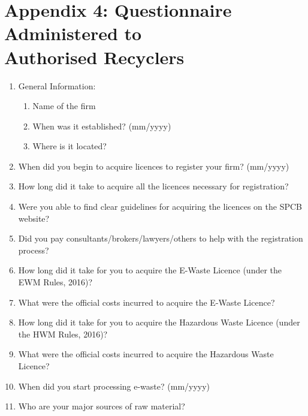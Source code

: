 \documentclass[a4paper, 12pt]{article}
\begin{document}
\section*{Appendix 4: Questionnaire Administered to \\ Authorised Recyclers}
\begin{mdframed}[backgroundcolor=gray!20]

\begin{enumerate}
                       \item General Information:
                          \begin{enumerate}[noitemsep]
                          	 \item Name of the firm
                    	  \item When was it established? (mm/yyyy)
                    	   \item Where is it located?
                       \end{enumerate}
                       \item When did you begin to acquire licences to register your firm? (mm/yyyy)
                       \item How long did it take to acquire all the licences necessary for registration?
                       \item Were you able to find clear guidelines for acquiring the licences on the SPCB website? 
                       \item Did you pay consultants/brokers/lawyers/others to help with the registration process? 
                       \item How long did it take for you to acquire the E-Waste Licence (under the EWM Rules, 2016)?
                       \item What were the official costs incurred to acquire the E-Waste Licence?
                       \item How long did it take for you to acquire the Hazardous Waste Licence (under the HWM Rules, 2016)? 
                        \item What were the official costs incurred to acquire the Hazardous Waste Licence? 
                        \item When did you start processing e-waste? (mm/yyyy) 
                        \item Who are your major sources of raw material?
                        \begin{enumerate}[noitemsep]

\end{enumerate}
\end{enumerate}
\end{mdframed}
\end{document}
